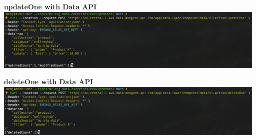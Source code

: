 \documentclass[14pt,a4paper]{extarticle}
\begin{document}
	\noindent \textbf{updateOne with Data API} \\
	\includegraphics[width=\textwidth]{images/sc12.png} 

	\noindent \textbf{deleteOne with Data API} \\
	\includegraphics[width=\textwidth]{images/sc13.png} 


	

\end{document}
